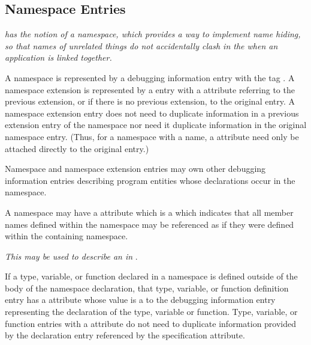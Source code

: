 \subsection{Namespace Entries}
\label{chap:namespaceentries}
\textit{ has the notion of a namespace, which provides a way to
implement name hiding, so that names of unrelated things
do not accidentally clash in the 
 when an
application is linked together.}

A namespace is represented by a debugging information entry
with the tag \DWTAGnamespaceTARG. A namespace extension 
is\hypertarget{chap:DWATextensionpreviousnamespaceextensionororiginalnamespace}{}
represented by a \DWTAGnamespaceNAME{} entry with a 
\DWATextensionDEFN{}
attribute referring to the previous extension, or if there
is no previous extension, to the original 
\DWTAGnamespaceNAME{}
entry. A namespace extension entry does not need to duplicate
information in a previous extension entry of the namespace
nor need it duplicate information in the original namespace
entry. (Thus, for a namespace with a name, 
a \DWATname{} attribute 
need only be attached directly to the original
\DWTAGnamespaceNAME{} entry.)

Namespace and namespace extension entries may own 
other
debugging information entries describing program entities
whose declarations occur in the namespace.

A namespace may have a 
\DWATexportsymbolsDEFN{}
attribute
which is a \CLASSflag{} which
indicates that all member names defined within the 
namespace may be referenced as if they were defined within 
the containing namespace. 

\textit{This may be used to describe an  in }.

If a type, variable, or function declared in a namespace is
defined outside of the body of the namespace declaration,
that type, variable, or function definition entry has a
\DWATspecification{} attribute 
whose value is a  to the
debugging information entry representing the declaration of
the type, variable or function. Type, variable, or function
entries with a 
\DWATspecification{} attribute 
do not need
to duplicate information provided by the declaration entry
referenced by the specification attribute.

